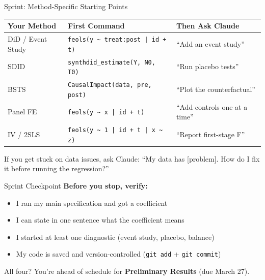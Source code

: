 \begin{frame}{Sprint: Method-Specific Starting Points}
  \small
  \begin{tabular}{@{}p{2.5cm}p{4.5cm}p{3.8cm}@{}}
    \toprule
    \textbf{Your Method} & \textbf{First Command} & \textbf{Then Ask Claude} \\
    \midrule
    DiD / Event Study & \texttt{feols(y \textasciitilde{} treat:post | id + t)} & ``Add an event study'' \\[4pt]
    SDID & \texttt{synthdid\_estimate(Y, N0, T0)} & ``Run placebo tests'' \\[4pt]
    BSTS & \texttt{CausalImpact(data, pre, post)} & ``Plot the counterfactual'' \\[4pt]
    Panel FE & \texttt{feols(y \textasciitilde{} x | id + t)} & ``Add controls one at a time'' \\[4pt]
    IV / 2SLS & \texttt{feols(y \textasciitilde{} 1 | id + t | x \textasciitilde{} z)} & ``Report first-stage F'' \\
    \bottomrule
  \end{tabular}

  \vspace{8pt}

  If you get stuck on data issues, ask Claude: ``My data has [problem]. How do I fix it before running the regression?''
\end{frame}

\begin{frame}{Sprint Checkpoint}
  \textbf{Before you stop, verify:}

  \vspace{8pt}

  \begin{itemize}
    \item[$\square$] I ran my main specification and got a coefficient
    \item[$\square$] I can state in one sentence what the coefficient means
    \item[$\square$] I started at least one diagnostic (event study, placebo, balance)
    \item[$\square$] My code is saved and version-controlled (\texttt{git add} + \texttt{git commit})
  \end{itemize}

  \vspace{8pt}

  All four? You're ahead of schedule for \textbf{Preliminary Results} (due March 27).
\end{frame}

